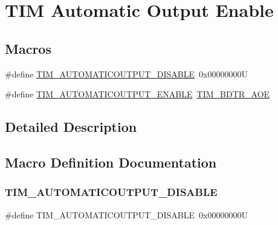 \hypertarget{group___t_i_m___a_o_e___bit___set___reset}{}\section{T\+IM Automatic Output Enable}
\label{group___t_i_m___a_o_e___bit___set___reset}
\subsection*{Macros}
\begin{DoxyCompactItemize}
\item 
\#define \mbox{\hyperlink{group___t_i_m___a_o_e___bit___set___reset_ga65b4336dee767fbe8d8cc4f980f6b18e}{T\+I\+M\+\_\+\+A\+U\+T\+O\+M\+A\+T\+I\+C\+O\+U\+T\+P\+U\+T\+\_\+\+D\+I\+S\+A\+B\+LE}}~0x00000000U
\item 
\#define \mbox{\hyperlink{group___t_i_m___a_o_e___bit___set___reset_ga09e7f3f768b0f122f13fd47771f07ddf}{T\+I\+M\+\_\+\+A\+U\+T\+O\+M\+A\+T\+I\+C\+O\+U\+T\+P\+U\+T\+\_\+\+E\+N\+A\+B\+LE}}~\mbox{\hyperlink{group___peripheral___registers___bits___definition_ga59f15008050f91fa3ecc9eaaa971a509}{T\+I\+M\+\_\+\+B\+D\+T\+R\+\_\+\+A\+OE}}
\end{DoxyCompactItemize}


\subsection{Detailed Description}


\subsection{Macro Definition Documentation}
\mbox{\label{group___t_i_m___a_o_e___bit___set___reset_ga65b4336dee767fbe8d8cc4f980f6b18e}} 
\subsubsection{\texorpdfstring{TIM\_AUTOMATICOUTPUT\_DISABLE}{TIM\_AUTOMATICOUTPUT\_DISABLE}}
{\footnotesize\ttfamily \#define T\+I\+M\+\_\+\+A\+U\+T\+O\+M\+A\+T\+I\+C\+O\+U\+T\+P\+U\+T\+\_\+\+D\+I\+S\+A\+B\+LE~0x00000000U}

